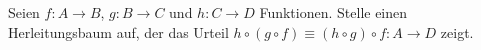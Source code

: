 \documentclass{uebung}
\begin{document}

\begin{exercise}
  Seien $f:A\to B$, $g:B\to C$ und $h:C\to D$ Funktionen.
  Stelle einen Herleitungsbaum auf, der das Urteil $h\circ(g\circ f)\equiv (h\circ g)\circ f:A\to D$ zeigt.
\end{exercise}
\end{document}
